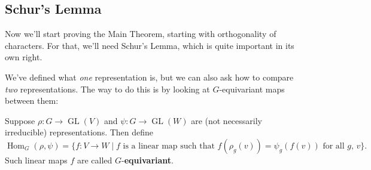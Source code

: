 


\subsection{Schur's Lemma}

Now we'll start proving the Main Theorem, starting with orthogonality of characters. For that, we'll need Schur's Lemma, which is quite important in its own right. 

We've defined what \emph{one} representation is, but we can also ask how to compare \emph{two} representations. The way to do this is by looking at $G$-equivariant maps between them: 

\begin{definition}
Suppose $\rho : G \to \operatorname{GL}(V)$ and $\psi : G \to \operatorname{GL}(W)$ are (not necessarily irreducible) representations. Then define \[\operatorname{Hom}_G(\rho, \psi) = \{f : V \to W \mid f \text{ is a linear map such that $f(\rho_g(v)) = \psi_g(f(v))$ for all $g$, $v$}\}.\] Such linear maps $f$ are called $G$-\textbf{equivariant}. 
\end{definition}


